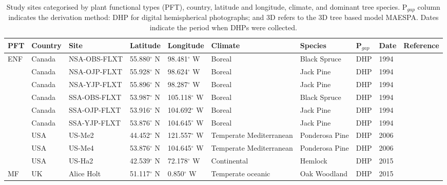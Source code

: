 \documentclass[a4paper,11pt]{report}
\begin{document}
\begin{sidewaystable}
\caption{Study sites categorised by plant functional types (PFT), country, latitude and longitude, climate, and dominant tree species. P$_{gap}$ column indicates the derivation method: DHP for digital hemispherical photographs; and 3D refers to the 3D tree based model MAESPA. Dates indicate the period when DHPs were collected. }
\begin{tabular}{p{1.0cm} p{1.5cm} p{2.1cm} p{2.1cm} p{2.1cm} p{2.1cm} p{2.1cm} p{2.5cm} p{1.0cm} p{2.1cm}}
\hline
\hline   
\bf PFT & \bf Country & \bf Site & \bf Latitude & \bf Longitude & \bf Climate & \bf Species & \bf P$_{gap}$ & \bf Date & \bf Reference\\
 \hline
\multirow{9}{*}{ENF} 
     & Canada &  NSA-OBS-FLXT &   55.880$^{\circ}$ N & 98.481$^{\circ}$ W & Boreal & Black Spruce & DHP & 1994 & \citet{Sellers1997}\\
     & Canada &  NSA-OJP-FLXT &   55.928$^{\circ}$ N & 98.624$^{\circ}$ W & Boreal & Jack Pine    & DHP & 1994 & \citet{Sellers1997}\\
     & Canada &  NSA-YJP-FLXT &   55.896$^{\circ}$ N & 98.287$^{\circ}$ W & Boreal & Jack Pine & DHP & 1994 & \citet{Sellers1997}\\
     & Canada &  SSA-OBS-FLXT &   53.987$^{\circ}$ N & 105.118$^{\circ}$ W & Boreal & Black Spruce & DHP & 1994 & \citet{Sellers1997}\\
     & Canada &  SSA-OJP-FLXT &   53.916$^{\circ}$ N & 104.692$^{\circ}$ W & Boreal & Jack Pine & DHP & 1994 & \citet{Sellers1997}\\
     & Canada &  SSA-YJP-FLXT &   53.876$^{\circ}$ N & 104.645$^{\circ}$ W & Boreal & Jack Pine & DHP & 1994 & \citet{Sellers1997}\\
     & USA    &  US-Me2       &   44.452$^{\circ}$ N & 121.557$^{\circ}$ W & Temperate Mediterranean & Ponderosa Pine & DHP & 2006 & \citet{DeKauwe2011,Thomas2009}\\
     & USA    &  US-Me4       &   53.876$^{\circ}$ N & 104.645$^{\circ}$ W & Temperate Mediterranean & Ponderosa Pine & DHP & 2006 & \citet{DeKauwe2011,Law2001}\\
     & USA    &  US-Ha2       &   42.539$^{\circ}$ N & 72.178$^{\circ}$ W  & Continental & Hemlock & DHP & 2015 & \citet{Hadley2002}\\
\hline
\multirow{1}{*}{MF} 
     & UK   &  Alice Holt   &   51.117$^{\circ}$ N & 0.850$^{\circ}$ W & Temperate oceanic & Oak Woodland & DHP & 2015 & \citet{Wilkinson2012}\\

\end{tabular}
\end{sidewaystable}
\end{document}
